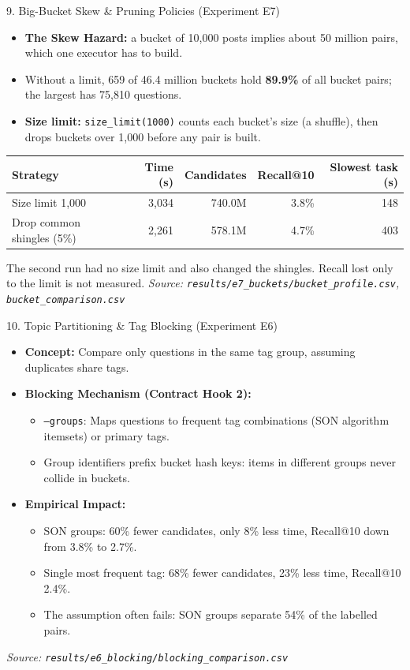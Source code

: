 \documentclass[aspectratio=169,10pt]{beamer}
\begin{document}
\begin{frame}{9. Big-Bucket Skew \& Pruning Policies (Experiment E7)}
  \begin{itemize}
    \item \textbf{The Skew Hazard:} a bucket of 10,000 posts implies about 50 million pairs, which one executor has to build.
    \item Without a limit, 659 of 46.4 million buckets hold \textbf{89.9\%} of all bucket pairs; the largest has 75,810 questions.
    \item \textbf{Size limit:} \texttt{size\_limit(1000)} counts each bucket's size (a shuffle), then drops buckets over 1,000 before any pair is built.
  \end{itemize}
  \begin{center}\begin{tabular}{lrrrr}
    \toprule
    Strategy & Time (s) & Candidates & Recall@10 & Slowest task (s) \\
    \midrule
    Size limit 1,000 & 3,034 & 740.0M & 3.8\% & 148 \\
    Drop common shingles (5\%) & 2,261 & 578.1M & 4.7\% & 403 \\
    \bottomrule
  \end{tabular}\end{center}
  \footnotesize{The second run had no size limit and also changed the shingles. Recall lost only to the limit is not measured.}
  \vfill
  \footnotesize{\textit{Source: \texttt{results/e7\_buckets/bucket\_profile.csv}, \texttt{bucket\_comparison.csv}}}
\end{frame}

\begin{frame}{10. Topic Partitioning \& Tag Blocking (Experiment E6)}
  \begin{itemize}
    \item \textbf{Concept:} Compare only questions in the same tag group, assuming duplicates share tags.
    \item \textbf{Blocking Mechanism (Contract Hook 2):}
      \begin{itemize}
        \item \texttt{--groups}: Maps questions to frequent tag combinations (SON algorithm itemsets) or primary tags.
        \item Group identifiers prefix bucket hash keys: items in different groups never collide in buckets.
      \end{itemize}
    \item \textbf{Empirical Impact:}
      \begin{itemize}
        \item SON groups: 60\% fewer candidates, only 8\% less time, Recall@10 down from 3.8\% to 2.7\%.
        \item Single most frequent tag: 68\% fewer candidates, 23\% less time, Recall@10 2.4\%.
        \item The assumption often fails: SON groups separate 54\% of the labelled pairs.
      \end{itemize}
  \end{itemize}
  \vfill
  \footnotesize{\textit{Source: \texttt{results/e6\_blocking/blocking\_comparison.csv}}}
\end{frame}
\end{document}
